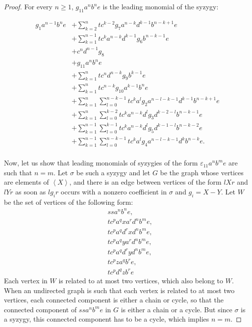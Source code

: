 \documentclass[sigconf]{acmart}
\theoremstyle{plain}
\theoremstyle{definition}
\theoremstyle{remark}
\begin{document}
\begin{proof}
  For every $n \geq 1$, $g_{11}a^nb^ne$ is the leading monomial of the syzygy:

  \begin{align*}
    g_1a^{n-1}b^ne & + \sum_{k = 2}^{n} tc^{k - 2}g_7a^{n - k}d^{k - 1}b^{n - k + 1}e \\
    & + \sum_{k = 1}^{n - 1} tc^ka^{n - k}d^{k - 1}g_6b^{n - k - 1}e \\
    & + c^nd^{n - 1}g_8 \\
    & + g_{11}a^nb^ne \\
    & + \sum_{k = 1}^n tc^nd^{n - k}g_9b^{k - 1}e \\
    & + \sum_{k = 1}^n tc^{n - k}g_{10}a^{k - 1}b^ne \\
    & + \sum_{k = 1}^{n} \sum_{l = 0}^{n - k - 1} tc^{k}a^{l}g_2a^{n - l - k - 1}d^{k - 1}b^{n - k + 1} e \\
    & + \sum_{k = 1}^{n} \sum_{l = 0}^{k - 2} tc^{k}a^{n - k}d^lg_3d^{k - 2 - l}b^{n - k - 1}e \\
    & + \sum_{k = 1}^{n - 1} \sum_{l = 0}^{k - 1} tc^{k}a^{n - k}d^lg_5d^{k - 1 - l}b^{n - k - 2}e \\
    & + \sum_{k = 1}^{n - 1} \sum_{l = 0}^{n - k - 1} tc^{k}a^{l}g_4a^{n - l - k - 1}d^{k}b^{n - k} e. \\
  \end{align*}

  Now, let us show that leading monomials of syzygies of the form $\varepsilon_{11}a^nb^me$ are such that $n = m$.
  Let $\sigma$ be such a syzygy and let $G$ be the graph whose vertices are elements of $\left\langle X \right\rangle$, and there is an edge between vertices of the form $lXr$ and $lYr$ as soon as $lg_ir$ occurs with a nonzero coefficient in $\sigma$ and $g_i=X - Y$. Let $W$ be the set of vertices of the following form:
  \begin{align*}
    & ssa^nb^ne, \\
    & tc^pa^qxa^rd^nb^me, \\
    & tc^pa^qd^rxd^nb^me, \\
    & tc^pa^qya^rd^nb^me, \\
    & tc^pa^qd^ryd^nb^me, \\
    & tc^pza^qb^re, \\
    & tc^pd^qzb^re
  \end{align*}
  Each vertex in $W$ is related to at most two vertices, which also belong to $W$. When an undirected graph is such that each vertex is related to at most two vertices, each connected component is either a chain or cycle, so that the connected component of $ssa^nb^me$ in $G$ is either a chain or a cycle.
  But since $\sigma$ is a syzygy, this connected component has to be a cycle, which implies $n = m$.


\end{proof}
\end{document}
